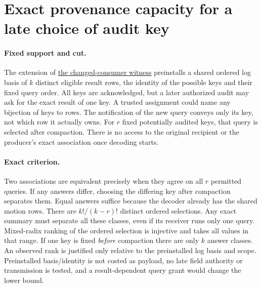 \documentclass{article}
\begin{document}
\section*{Exact provenance capacity for a late choice of audit key}
\paragraph{Fixed support and cut.}
The extension of \href{https://github.com/eternal-november/eos-research-programmes/pull/818}{the changed-consumer witness}
preinstalls a shared ordered log basis of $k$ distinct eligible
result rows, the identity of the possible keys and their fixed
query order. All keys are acknowledged, but a later authorized
audit may ask for the exact result of one key. A trusted assignment
could name any bijection of keys to rows. The notification of the
new query conveys only its key, not which row it actually owns.
For $r$ fixed potentially audited keys, that query is selected after
compaction. There is no access to the original recipient or the
producer's exact association once decoding starts.

\paragraph{Exact criterion.}
Two associations are equivalent precisely when they agree on all
$r$ permitted queries. If any answers differ, choosing the differing
key after compaction separates them. Equal answers suffice because
the decoder already has the shared motion rows. There are
$k!/(k-r)!$ distinct ordered selections. Any exact summary
must separate all these classes, even if its receiver runs only
one query. Mixed-radix ranking of the ordered selection is injective
and takes all values in that range. If one key is fixed
\emph{before} compaction there are only $k$ answer classes.
An observed rank is justified only relative to the preinstalled
log basis and scope. Preinstalled basis/identity is not costed
as payload, no late field authority or transmission is tested,
and a result-dependent query grant would change the lower bound.
\end{document}
